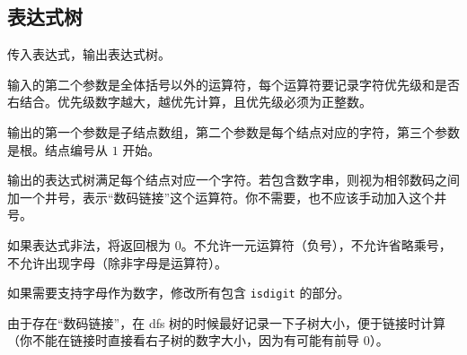 \documentclass[12pt]{ctexart}
\begin{document}
\subsection{表达式树}

传入表达式，输出表达式树。

输入的第二个参数是全体括号以外的运算符，每个运算符要记录字符优先级和是否右结合。优先级数字越大，越优先计算，且优先级必须为正整数。

输出的第一个参数是子结点数组，第二个参数是每个结点对应的字符，第三个参数是根。结点编号从 $1$ 开始。

输出的表达式树满足每个结点对应一个字符。若包含数字串，则视为相邻数码之间加一个井号，表示“数码链接”这个运算符。你不需要，也不应该手动加入这个井号。

如果表达式非法，将返回根为 $0$。不允许一元运算符（负号），不允许省略乘号，不允许出现字母（除非字母是运算符）。

如果需要支持字母作为数字，修改所有包含 \verb|isdigit| 的部分。

由于存在“数码链接”，在 dfs 树的时候最好记录一下子树大小，便于链接时计算（你不能在链接时直接看右子树的数字大小，因为有可能有前导 $0$）。
\end{document}
